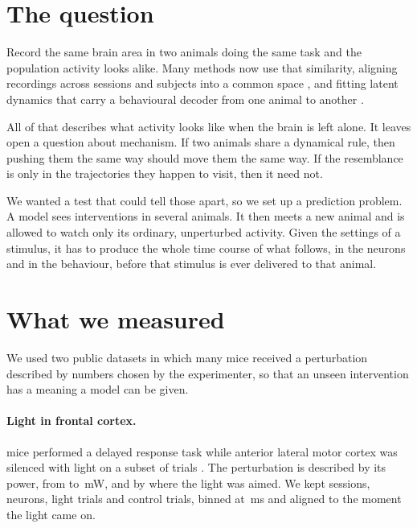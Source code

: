 \documentclass[11pt,letterpaper]{article}
\begin{document}
\begin{abstract}
How much transfers grows with the size of the cohort the operator was fitted on and
with how well each animal was measured, and fitting it on one animal is far worse than
predicting nothing at all. So a shared causal rule does reach single cells, when the
perturbation engages structure the animals have in common, and how far it reaches is
set by what has been measured so far.
\end{abstract}


\section{The question}

Record the same brain area in two animals doing the same task and the population
activity looks alike. Many methods now use that similarity, aligning recordings across
sessions and subjects into a common space \citep{marble,candy,cca,procrustes,dsa}, and
fitting latent dynamics that carry a behavioural decoder from one animal to another
\citep{lfads,ndt}.

All of that describes what activity looks like when the brain is left alone. It leaves
open a question about mechanism. If two animals share a dynamical rule, then pushing
them the same way should move them the same way. If the resemblance is only in the
trajectories they happen to visit, then it need not.

We wanted a test that could tell those apart, so we set up a prediction problem.
A model sees interventions in several animals. It then meets a new animal and is
allowed to watch only its ordinary, unperturbed activity. Given the settings of a
stimulus, it has to produce the whole time course of what follows, in the neurons and
in the behaviour, before that stimulus is ever delivered to that animal.

\section{What we measured}

We used two public datasets in which many mice received a perturbation described by
numbers chosen by the experimenter, so that an unseen intervention has a meaning a
model can be given.

\paragraph{Light in frontal cortex.}
\AllAnimals{} mice performed a delayed response task while anterior lateral motor
cortex was silenced with light on a subset of trials
\citep{alm_svoboda, alm_wide_a, alm_wide_b}. The perturbation is described by its
power, from \AlmPowerMin{} to \AlmPowerMax\,mW, and by where the light was aimed. We
kept \AllSessions{} sessions, \AllUnits{} neurons, \AllStimTrials{} light trials and
\AllCtrlTrials{} control trials, binned at \AlmBinMs\,ms and aligned to the moment the
light came on.
\end{document}
